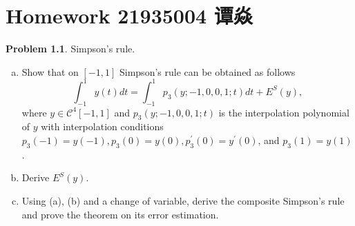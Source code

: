 \documentclass[a4paper]{book}
\makeatletter
\newcommand{\voidenvironment}[1]{%
  \expandafter\providecommand\csname env@#1@save@env\endcsname{}%
  \expandafter\providecommand\csname env@#1@process\endcsname{}%
  \@ifundefined{#1}{}{\RenewEnviron{#1}{}}%
}
\numberwithin{equation}{chapter}
\theoremstyle{definition}
\newtheorem{pro}[exm]{Problem}
\makeatother
\begin{document}
\pagestyle{empty}
% 



\setcounter{chapter}{8}




\chapter{Homework 21935004 谭焱}


\begin{pro}
  Simpson's rule.
  \begin{enumerate}[(a)]
  \item Show that on $[-1,1]$ Simpson's rule can be obtained as follows
    \[\int_{-1}^1 y(t) dt = \int_{-1}^1 p_3(y; -1,0,0,1;t) dt + E^S(y),\]
    where $y \in \mathcal{C}^4 [-1,1]$ and $p_3(y;-1,0,0,1;t)$ is the interpolation polynomial of $y$ with interpolation conditions $p_3(-1) = y(-1),p_3(0) = y(0), p_3^\prime(0) = y^\prime(0)$, and $p_3(1) = y(1)$.

  \item Derive $E^S(y)$.

  \item Using (a), (b) and a change of variable, derive the composite Simpson's rule and prove the theorem on its error estimation.
    
  \end{enumerate}
\end{pro}
\end{document}
